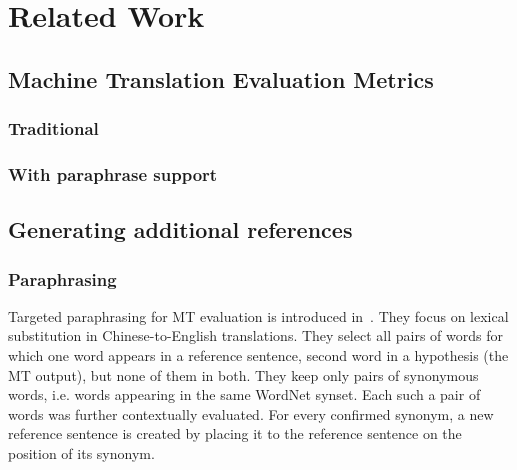 \chapter{Related Work}


\section{Machine Translation Evaluation Metrics}
\subsection{Traditional}



\subsection{With paraphrase support}




\section{Generating additional references}
\subsection{Paraphrasing}
Targeted paraphrasing for MT evaluation is introduced in~\citet{kauchak}. They 
focus on lexical substitution in Chinese-to-English translations. 
They select all pairs of words for which one word appears in a reference sentence,
second word in a hypothesis (the MT output), but none of them in both. They keep 
only pairs of synonymous words, i.e. words appearing in the same WordNet 
\cite{wordnet} synset. Each such a pair of words was further contextually evaluated. 
For every confirmed synonym, a new reference sentence is created by placing it to the
reference sentence on the position of its synonym.


